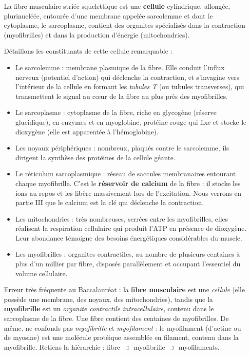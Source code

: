 \documentclass[11pt]{article}
\newcommand{\cle}[1]{{\popxbold\color{popdark}#1}}
\newcounter{popsec}
\newcounter{popsub}
\newcommand{\courssub}[1]{%
  \stepcounter{popsub}%
  \par\vspace{9pt}\noindent{\popxbold\fontsize{11.5}{13}\selectfont\color{popink}{\color{poporange}\thepopsec.\thepopsub}\hspace{6pt}#1}\par\nopagebreak\vspace{4pt}
}
\begin{document}
\courssub{Structure fine de la fibre musculaire}

\begin{definition}
La \cle{fibre musculaire} striée squelettique est une \textbf{cellule} cylindrique, allongée, plurinucléée, entourée d'une membrane appelée \cle{sarcolemme} et dont le cytoplasme, le \cle{sarcoplasme}, contient des organites spécialisés dans la contraction (myofibrilles) et dans la production d'énergie (mitochondries).
\end{definition}

Détaillons les constituants de cette cellule remarquable :

\begin{itemize}
\item Le \cle{sarcolemme} : membrane plasmique de la fibre. Elle conduit l'influx nerveux (potentiel d'action) qui déclenche la contraction, et s'invagine vers l'intérieur de la cellule en formant les \emph{tubules T} (ou tubules transverses), qui transmettent le signal au cœur de la fibre au plus près des myofibrilles.
\item Le \cle{sarcoplasme} : cytoplasme de la fibre, riche en glycogène (réserve glucidique), en enzymes et en \cle{myoglobine}, protéine rouge qui fixe et stocke le dioxygène (elle est apparentée à l'hémoglobine).
\item Les \cle{noyaux périphériques} : nombreux, plaqués contre le sarcolemme, ils dirigent la synthèse des protéines de la cellule géante.
\item Le \cle{réticulum sarcoplasmique} : réseau de saccules membranaires entourant chaque myofibrille. C'est le \textbf{réservoir de calcium} de la fibre : il stocke les ions  au repos et les libère massivement lors de l'excitation. Nous verrons en partie III que le calcium est la clé qui déclenche la contraction.
\item Les \cle{mitochondries} : très nombreuses, serrées entre les myofibrilles, elles réalisent la respiration cellulaire qui produit l'ATP en présence de dioxygène. Leur abondance témoigne des besoins énergétiques considérables du muscle.
\item Les \cle{myofibrilles} : organites contractiles, au nombre de plusieurs centaines à plus d'un millier par fibre, disposés parallèlement et occupant l'essentiel du volume cellulaire.
\end{itemize}

\begin{attention}
Erreur très fréquente au Baccalauréat : la \textbf{fibre musculaire} est une \emph{cellule} (elle possède une membrane, des noyaux, des mitochondries), tandis que la \textbf{myofibrille} est un \emph{organite contractile intracellulaire}, contenu dans le sarcoplasme de la fibre. Une fibre contient des centaines de myofibrilles. De même, ne confonds pas \emph{myofibrille} et \emph{myofilament} : le myofilament (d'actine ou de myosine) est une molécule protéique assemblée en filament, contenu dans la myofibrille. Retiens la hiérarchie : fibre $\supset$ myofibrille $\supset$ myofilaments.
\end{attention}
\end{document}
